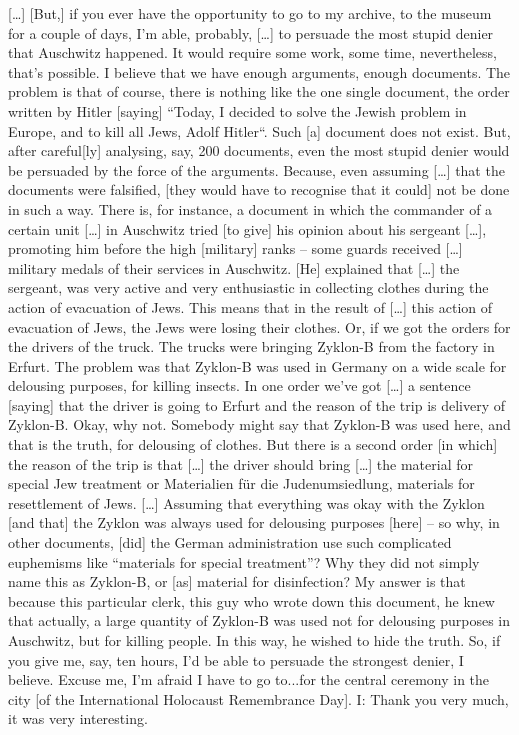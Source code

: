[…] [But,] if you ever have the opportunity to go to my archive, to the museum for a couple of days, I’m able, probably, […] to persuade the most stupid denier that Auschwitz happened. It would require some work, some time, nevertheless, that’s possible. I believe that we have enough arguments, enough documents. The problem is that of course, there is nothing like the one single document, the order written by Hitler [saying] “Today, I decided to solve the Jewish problem in Europe, and to kill all Jews, Adolf Hitler“. Such [a] document does not exist. But, after careful[ly] analysing, say, 200 documents, even the most stupid denier would be persuaded by the force of the arguments. Because, even assuming […] that the documents were falsified, [they would have to recognise that it could] not be done in such a way. There is, for instance, a document in which the commander of a certain unit […] in Auschwitz tried [to give] his opinion about his sergeant […], promoting him before the high [military] ranks – some guards received […] military medals of their services in Auschwitz. [He] explained that […] the sergeant, was very active and very enthusiastic in collecting clothes during the action of evacuation of Jews. This means that in the result of […] this action of evacuation of Jews, the Jews were losing their clothes. Or, if we got the orders for the drivers of the truck. The trucks were bringing Zyklon-B from the factory in Erfurt. The problem was that Zyklon-B was used in Germany on a wide scale for delousing purposes, for killing insects. In one order we’ve got […] a sentence [saying] that the driver is going to Erfurt and the reason of the trip is delivery of Zyklon-B. Okay, why not. Somebody might say that Zyklon-B was used here, and that is the truth, for delousing of clothes. But there is a second order [in which] the reason of the trip is that […] the driver should bring […] the material for special Jew treatment or Materialien für die Judenumsiedlung, materials for resettlement of Jews. […] Assuming that everything was okay with the Zyklon [and that] the Zyklon was always used for delousing purposes [here] – so why, in other documents, [did] the German administration use such complicated euphemisms like “materials for special treatment”? Why they did not simply name this as Zyklon-B, or [as] material for disinfection? My answer is that because this particular clerk, this guy who wrote down this document, he knew that actually, a large quantity of Zyklon-B was used not for delousing purposes in Auschwitz, but for killing people. In this way, he wished to hide the truth. 
So, if you give me, say, ten hours, I’d be able to persuade the strongest denier, I believe. Excuse me, I’m afraid I have to go to...for the central ceremony in the city [of the International Holocaust Remembrance Day].
I: Thank you very much, it was very interesting.
